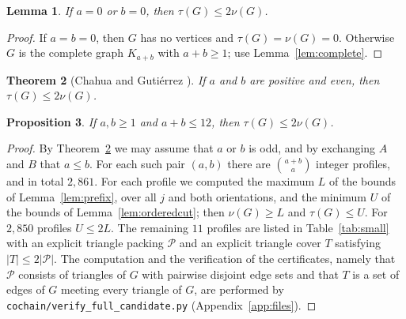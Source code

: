 \documentclass{amsart}
\newtheorem{theorem}{Theorem}[section]
\newtheorem{lemma}[theorem]{Lemma}
\newtheorem{proposition}[theorem]{Proposition}
\theoremstyle{definition}
\theoremstyle{remark}
\numberwithin{equation}{section}
\numberwithin{table}{section}
\begin{document}
\begin{lemma}\label{lem:emptypart}
If $a=0$ or $b=0$, then $\tau(G)\le2\nu(G)$.
\end{lemma}

\begin{proof}
If $a=b=0$, then $G$ has no vertices and $\tau(G)=\nu(G)=0$. Otherwise $G$ is the complete graph $K_{a+b}$ with $a+b\ge1$; use Lemma~\ref{lem:complete}.
\end{proof}

\begin{theorem}[Chahua and Guti\'errez {\cite[Theorem~1]{CG}}]\label{thm:CG}
If $a$ and $b$ are positive and even, then $\tau(G)\le2\nu(G)$.
\end{theorem}

\begin{proposition}\label{prop:small}
If $a,b\ge1$ and $a+b\le12$, then $\tau(G)\le2\nu(G)$.
\end{proposition}

\begin{proof}
By Theorem~\ref{thm:CG} we may assume that $a$ or $b$ is odd, and by exchanging $A$ and $B$ that $a\le b$. For each such pair $(a,b)$ there are $\binom{a+b}a$ integer profiles, and in total $2{,}861$. For each profile we computed the maximum $L$ of the bounds of Lemma~\ref{lem:prefix}, over all $j$ and both orientations, and the minimum $U$ of the bounds of Lemma~\ref{lem:orderedcut}; then $\nu(G)\ge L$ and $\tau(G)\le U$. For $2{,}850$ profiles $U\le2L$. The remaining $11$ profiles are listed in Table~\ref{tab:small} with an explicit triangle packing $\mathcal P$ and an explicit triangle cover $T$ satisfying $|T|\le2|\mathcal P|$. The computation and the verification of the certificates, namely that $\mathcal P$ consists of triangles of $G$ with pairwise disjoint edge sets and that $T$ is a set of edges of $G$ meeting every triangle of $G$, are performed by \texttt{cochain/verify\_full\_candidate.py} (Appendix~\ref{app:files}).
\end{proof}
\end{document}
